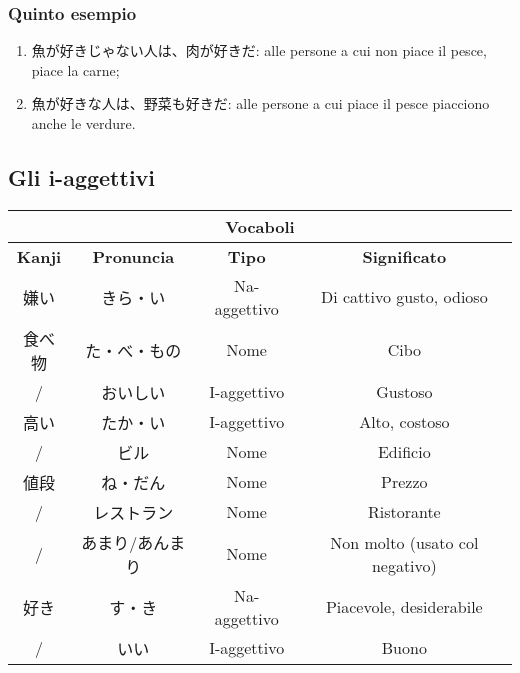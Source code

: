 \documentclass{article}
\let\ita\textitalian
\let\jap\textjapanese
\newcommand{\itabf}[1]{\ita{\textbf{#1}}}
\newenvironment{tabAdj}{\begin{center}\begin{japanese}\begin{longtable}{|c|c|c|c|}}{\end{longtable}\end{japanese}\end{center}}
\begin{document}
            \subsubsection*{Quinto esempio}

                \begin{enumerate}
                    \item \jap{魚が好きじゃない人は、肉が好きだ}: alle persone a cui non piace il pesce, piace la carne;
                    \item \jap{魚が好きな人は、野菜も好きだ}: alle persone a cui piace il pesce piacciono anche le verdure.
                \end{enumerate}

        \subsection{Gli i-aggettivi}

            \begin{tabAdj}
                \hline
                \multicolumn{4}{|c|}{\itabf{Vocaboli}}\\
                \hline
                \itabf{Kanji} & \itabf{Pronuncia} & \itabf{Tipo} & \itabf{Significato}\\
                \hline\hline
                嫌い & きら・い & \ita{Na-aggettivo} & \ita{Di cattivo gusto, odioso}\\
                \hline
                食べ物 & た・べ・もの & \ita{Nome} & \ita{Cibo}\\
                \hline
                / & おいしい & \ita{I-aggettivo} & \ita{Gustoso}\\
                \hline
                高い & たか・い & \ita{I-aggettivo} & \ita{Alto, costoso}\\
                \hline
                / & ビル & \ita{Nome} & \ita{Edificio}\\
                \hline
                値段 & ね・だん & \ita{Nome} & \ita{Prezzo}\\
                \hline
                / & レストラン & \ita{Nome} & \ita{Ristorante}\\
                \hline
                / & あまり/あんまり & \ita{Nome} & \ita{Non molto (usato col negativo)}\\
                \hline
                好き & す・き & \ita{Na-aggettivo} & \ita{Piacevole, desiderabile}\\
                \hline
                / & いい & \ita{I-aggettivo} & \ita{Buono}\\
                \hline
            \end{tabAdj}
\end{document}
